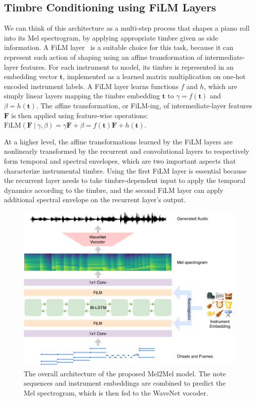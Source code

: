 \subsection{Timbre Conditioning using FiLM Layers}

We can think of this architecture as a multi-step process that shapes a piano roll into its Mel spectrogram, by applying appropriate timbre given as side information.
A FiLM layer~\cite{perez2018film} is a suitable choice for this task, because it can represent such action of shaping using an affine transformation of intermediate-layer features.
For each instrument to model, its timbre is represented in an embedding vector $\mathbf{t}$, implemented as a learned matrix multiplication on one-hot encoded instrument labels.
A FiLM layer learns functions $f$ and $h$, which are simply linear layers mapping the timbre embedding $\mathbf{t}$ to $\gamma = f ( \mathbf{t} )$ and $\beta = h ( \mathbf{t} )$.
The affine transformation, or FiLM-ing, of intermediate-layer features $\mathbf{F}$ is then applied using feature-wise operations: $
\mathrm{FiLM}(\mathbf{F} ~|~ \gamma, \beta)
= \gamma \mathbf{F} + \beta
= f(\mathbf{t})\mathbf{F} + h(\mathbf{t}). $

At a higher level, the affine transformations learned by the FiLM layers are nonlinearly transformed by the recurrent and convolutional layers to respectively form temporal and spectral envelopes, which are two important aspects that characterize instrumental timbre.
Using the first FiLM layer is essential because the recurrent layer needs to take timbre-dependent input to apply the temporal dynamics according to the timbre, and the second FiLM layer can apply additional spectral envelope on the recurrent layer's output.

\begin{figure}[t]
	\centering
	\includegraphics[width=\linewidth]{architecture.pdf}
	\caption{The overall architecture of the proposed Mel2Mel model. The note sequences and instrument embeddings are combined to predict the Mel spectrogram, which is then fed to the WaveNet vocoder.}
	\label{fig:mel2mel-architecture}
\end{figure}

